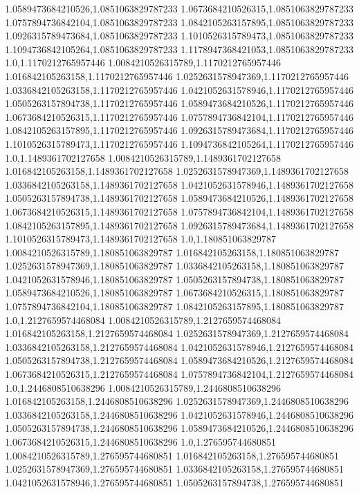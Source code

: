 1.0589473684210526,1.0851063829787233
1.0673684210526315,1.0851063829787233
1.0757894736842104,1.0851063829787233
1.0842105263157895,1.0851063829787233
1.0926315789473684,1.0851063829787233
1.1010526315789473,1.0851063829787233
1.1094736842105264,1.0851063829787233
1.1178947368421053,1.0851063829787233
1.0,1.1170212765957446
1.0084210526315789,1.1170212765957446
1.016842105263158,1.1170212765957446
1.0252631578947369,1.1170212765957446
1.0336842105263158,1.1170212765957446
1.0421052631578946,1.1170212765957446
1.0505263157894738,1.1170212765957446
1.0589473684210526,1.1170212765957446
1.0673684210526315,1.1170212765957446
1.0757894736842104,1.1170212765957446
1.0842105263157895,1.1170212765957446
1.0926315789473684,1.1170212765957446
1.1010526315789473,1.1170212765957446
1.1094736842105264,1.1170212765957446
1.0,1.1489361702127658
1.0084210526315789,1.1489361702127658
1.016842105263158,1.1489361702127658
1.0252631578947369,1.1489361702127658
1.0336842105263158,1.1489361702127658
1.0421052631578946,1.1489361702127658
1.0505263157894738,1.1489361702127658
1.0589473684210526,1.1489361702127658
1.0673684210526315,1.1489361702127658
1.0757894736842104,1.1489361702127658
1.0842105263157895,1.1489361702127658
1.0926315789473684,1.1489361702127658
1.1010526315789473,1.1489361702127658
1.0,1.180851063829787
1.0084210526315789,1.180851063829787
1.016842105263158,1.180851063829787
1.0252631578947369,1.180851063829787
1.0336842105263158,1.180851063829787
1.0421052631578946,1.180851063829787
1.0505263157894738,1.180851063829787
1.0589473684210526,1.180851063829787
1.0673684210526315,1.180851063829787
1.0757894736842104,1.180851063829787
1.0842105263157895,1.180851063829787
1.0,1.2127659574468084
1.0084210526315789,1.2127659574468084
1.016842105263158,1.2127659574468084
1.0252631578947369,1.2127659574468084
1.0336842105263158,1.2127659574468084
1.0421052631578946,1.2127659574468084
1.0505263157894738,1.2127659574468084
1.0589473684210526,1.2127659574468084
1.0673684210526315,1.2127659574468084
1.0757894736842104,1.2127659574468084
1.0,1.2446808510638296
1.0084210526315789,1.2446808510638296
1.016842105263158,1.2446808510638296
1.0252631578947369,1.2446808510638296
1.0336842105263158,1.2446808510638296
1.0421052631578946,1.2446808510638296
1.0505263157894738,1.2446808510638296
1.0589473684210526,1.2446808510638296
1.0673684210526315,1.2446808510638296
1.0,1.276595744680851
1.0084210526315789,1.276595744680851
1.016842105263158,1.276595744680851
1.0252631578947369,1.276595744680851
1.0336842105263158,1.276595744680851
1.0421052631578946,1.276595744680851
1.0505263157894738,1.276595744680851
